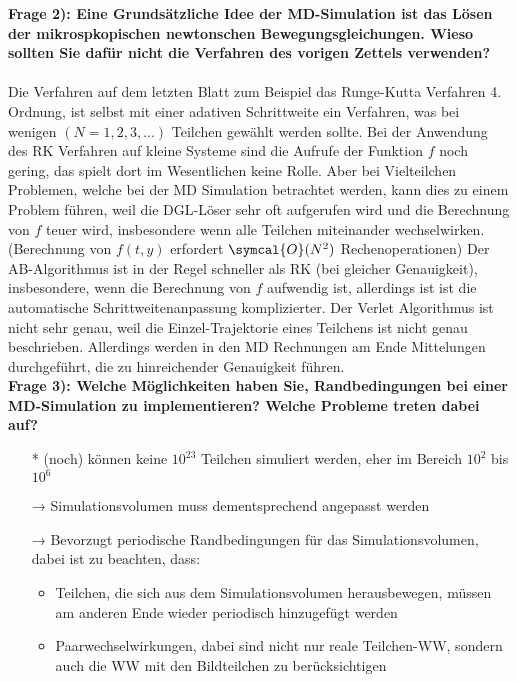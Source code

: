 \textbf{Frage 2): Eine Grundsätzliche Idee der MD-Simulation ist das Lösen der mikrospkopischen newtonschen
Bewegungsgleichungen. Wieso sollten Sie dafür nicht die Verfahren des vorigen Zettels verwenden?}\\ \\
Die Verfahren auf dem letzten Blatt zum Beispiel das Runge-Kutta Verfahren 4. Ordnung, ist selbst mit einer adativen Schrittweite ein Verfahren, was bei wenigen $(N = 1,2,3, ...)$ Teilchen gewählt werden sollte. Bei der Anwendung des RK Verfahren auf kleine Systeme sind die Aufrufe der Funktion $f$ noch gering, das spielt dort im Wesentlichen keine Rolle. Aber bei Vielteilchen Problemen, welche bei der MD Simulation betrachtet werden, kann dies zu einem Problem führen, weil die DGL-Löser sehr oft aufgerufen wird und die Berechnung von $f$ teuer wird, insbesondere wenn alle Teilchen miteinander wechselwirken. (Berechnung von $f(t,y)$ erfordert $\symcal{O}(N^2)$ Rechenoperationen)
Der AB-Algorithmus ist in der Regel schneller als RK (bei gleicher Genauigkeit), insbesondere, wenn die Berechnung von $f$ aufwendig ist, allerdings ist ist die automatische Schrittweitenanpassung komplizierter.
Der Verlet Algorithmus ist nicht sehr genau, weil die Einzel-Trajektorie eines Teilchens ist nicht genau beschrieben. Allerdings werden in den MD Rechnungen am Ende Mittelungen durchgeführt, die zu hinreichender Genauigkeit führen. \\

\textbf{Frage 3): Welche Möglichkeiten haben Sie, Randbedingungen bei einer MD-Simulation zu implementieren?
Welche Probleme treten dabei auf?}\\
\begin{itemize}
  \item[*] (noch) können keine $10^{23}$ Teilchen simuliert werden, eher im Bereich $10^2$ bis $10^6$
  \item[→] Simulationsvolumen muss dementsprechend angepasst werden
  \item[→] Bevorzugt periodische Randbedingungen für das Simulationsvolumen, dabei ist zu beachten, dass:
  \begin{itemize}
    \item Teilchen, die sich aus dem Simulationsvolumen herausbewegen, müssen am anderen Ende wieder periodisch hinzugefügt werden
    \item Paarwechselwirkungen, dabei sind nicht nur reale Teilchen-WW, sondern auch die WW mit den Bildteilchen zu berücksichtigen
  \end{itemize}
\end{itemize}
